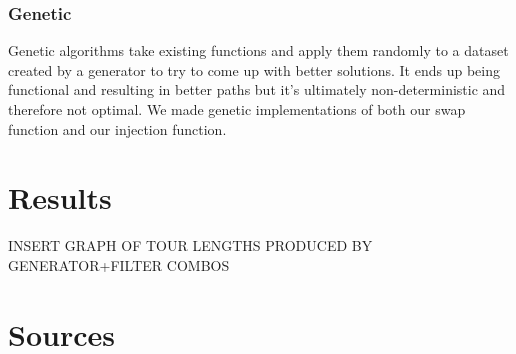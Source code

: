 \documentclass{article}
\begin{document}
\section*{Genetic}
Genetic algorithms take existing functions and apply them randomly to a dataset created by a generator to try to come up with better solutions. It ends up being functional and resulting in better paths but it's ultimately non-deterministic and therefore not optimal. We made genetic implementations of both our swap function and our injection function.

\part*{Results}
INSERT GRAPH OF TOUR LENGTHS PRODUCED BY GENERATOR+FILTER COMBOS


\part*{Sources}
\end{document}
